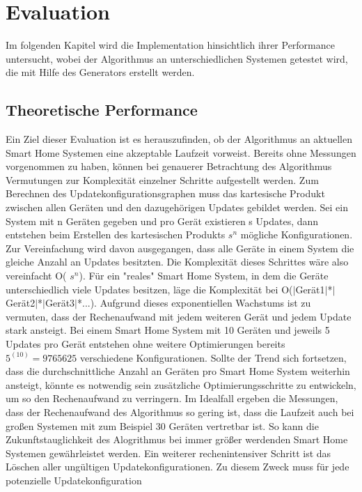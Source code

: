 \chapter{Evaluation}\label{ch:eval}

Im folgenden Kapitel wird die Implementation hinsichtlich ihrer Performance untersucht, wobei der Algorithmus an unterschiedlichen Systemen
getestet wird, die mit Hilfe des Generators erstellt werden. 

\section{Theoretische Performance}
Ein Ziel dieser Evaluation ist es herauszufinden, ob der Algorithmus an aktuellen Smart Home Systemen eine akzeptable Laufzeit vorweist.
Bereits ohne Messungen vorgenommen zu haben, können bei genauerer Betrachtung des Algorithmus Vermutungen zur Komplexität einzelner Schritte aufgestellt werden.
Zum Berechnen des Updatekonfigurationsgraphen muss das kartesische Produkt zwischen allen Geräten und den dazugehörigen Updates gebildet werden. 
Sei ein System mit n Geräten gegeben und pro Gerät existieren s Updates, dann entstehen beim Erstellen des kartesischen Produkts  \( s^n\) mögliche Konfigurationen.
Zur Vereinfachung wird davon ausgegangen, dass alle Geräte in einem System die gleiche Anzahl an Updates besitzten. Die Komplexität dieses Schrittes wäre also
vereinfacht O( \( s^n\)). Für ein "reales"  Smart Home System, in dem die Geräte unterschiedlich viele Updates besitzen, läge die Komplexität bei
O($\vert$Gerät1$\vert$*$\vert$Gerät2$\vert$*$\vert$Gerät3$\vert$*...).
Aufgrund dieses exponentiellen Wachstums ist zu vermuten, dass der Rechenaufwand mit jedem weiteren Gerät und jedem Update stark ansteigt.
Bei einem Smart Home System mit 10 Geräten und jeweils 5 Updates pro Gerät entstehen ohne weitere Optimierungen bereits \( 5^(10) = 9765625\)
verschiedene Konfigurationen. Sollte der Trend sich fortsetzen, dass die durchschnittliche Anzahl an Geräten pro Smart Home System weiterhin ansteigt, könnte
es notwendig sein zusätzliche Optimierungsschritte zu entwickeln, um so den Rechenaufwand zu verringern.
Im Idealfall ergeben die Messungen, dass der Rechenaufwand des Algorithmus so gering ist, dass die Laufzeit auch bei großen Systemen
mit zum Beispiel 30 Geräten vertretbar ist. So kann die Zukunftstauglichkeit des Alogrithmus bei immer größer werdenden Smart Home Systemen
gewährleistet werden.
Ein weiterer rechenintensiver Schritt ist das Löschen aller ungültigen Updatekonfigurationen. Zu diesem Zweck muss für jede potenzielle Updatekonfiguration
